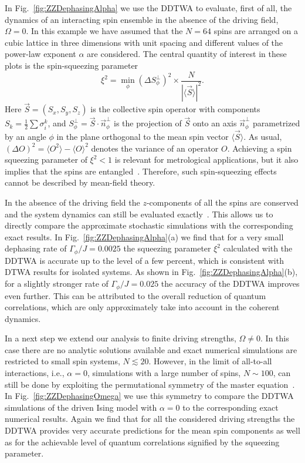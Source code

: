 \documentclass[pra,twocolumn,showpacs,preprintnumbers,amsmath,amssymb,superscriptaddress]{revtex4-1}
\newcommand{\erw}[1]{\langle#1\rangle}
\begin{document}
In Fig.~\ref{fig:ZZDephasingAlpha} we use the DDTWA to evaluate, first of all, the dynamics of an interacting spin ensemble in the absence of the driving field, $\Omega=0$. In this example we have assumed that the $N=64$ spins are arranged on a cubic lattice in three dimensions with unit spacing and different values of the power-law exponent $\alpha$ are considered. The central quantity of interest in these plots is the spin-squeezing parameter~\cite{Wineland1992}
\begin{equation}
\xi^2=\min_{\phi} (\Delta S_{\phi}^{\perp})^2 \times \frac{N}{|\erw{\vec S}|^2}.
\end{equation}
Here $\vec S=(S_x,S_y,S_z)$ is the collective spin operator with components $S_k=\frac{1}{2} \sum \sigma_i^k$, and $S_\phi^\perp=\vec S\cdot \vec n_\phi^\perp$ is the projection of $\vec S$ onto an axis $\vec n_\phi^\perp$ parametrized by an angle $\phi$ in the plane orthogonal to the mean spin vector $\erw{\vec S}$. As usual, $(\Delta O)^2 = \erw{O^2}-\erw{O}^2$ denotes the variance of an operator $O$. Achieving a spin squeezing parameter of $\xi^2<1$ is relevant for metrological applications, but it also implies that the spins are entangled~\cite{Sorensen2001}. Therefore, such spin-squeezing effects cannot be described by mean-field theory. 



In the absence of the driving field the $z$-components of all the spins are conserved and the system dynamics can still be evaluated exactly~\cite{FossFeig2013}. This allows us to directly compare the approximate stochastic simulations with the corresponding exact results. In Fig.~\ref{fig:ZZDephasingAlpha}(a) we find that for a very small dephasing rate of $\Gamma_{\phi}/J=0.0025$ the squeezing parameter $\xi^2$ calculated with the DDTWA is accurate up to the level of a few percent, which is consistent with DTWA results for isolated systems. As shown in Fig.~\ref{fig:ZZDephasingAlpha}(b), for a slightly stronger rate of $\Gamma_{\phi}/J=0.025$ the accuracy of the DDTWA improves even further. This can be attributed to the overall reduction of quantum correlations, which are only approximately take into account in the coherent dynamics.





In a next step we extend our analysis to finite driving strengths, $\Omega \neq 0$. In this case there are no analytic solutions available and exact numerical simulations are restricted to small spin systems, $N \lesssim 20$. However, in the limit of all-to-all interactions, i.e., $\alpha=0$, simulations with a large number of spins, $N \sim 100$, can still be done by exploiting the permutational symmetry of the master equation~\cite{Kirton2017,Shammah2018}. In Fig.~\ref{fig:ZZDephasingOmega} we use this symmetry to compare the DDTWA simulations of the driven Ising model with $\alpha=0$ to the corresponding exact numerical results. 
Again we find that for all the considered driving strengths the DDTWA provides very accurate predictions for the mean spin components as well as for the achievable level of quantum correlations signified by the squeezing parameter.
\end{document}
